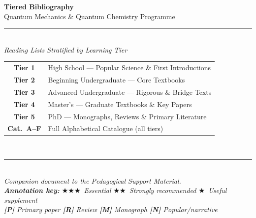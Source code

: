 \documentclass[11pt,a4paper]{article}
\newcommand{\essential}{$\bigstar\bigstar\bigstar$}
\newcommand{\recommended}{$\bigstar\bigstar$}
\newcommand{\useful}{$\bigstar$}
\begin{document}

\begin{titlepage}
\pagecolor{darkblue}
\color{white}
\vspace*{3cm}
\begin{center}
  {\fontsize{28}{34}\selectfont\bfseries Tiered Bibliography}\\[0.5cm]
  {\fontsize{17}{22}\selectfont Quantum Mechanics \& Quantum Chemistry Programme}\\[0.6cm]
  {\color{accentgold}\rule{10cm}{2pt}}\\[0.6cm]
  {\large\itshape Reading Lists Stratified by Learning Tier}\\[2.5cm]
  \begin{tabular}{@{}cl@{}}
    \colorbox{t1green}{\color{white}\bfseries Tier 1} & High School --- Popular Science \& First Introductions\\[4pt]
    \colorbox{t2blue}{\color{white}\bfseries Tier 2}  & Beginning Undergraduate --- Core Textbooks\\[4pt]
    \colorbox{t3purple}{\color{white}\bfseries Tier 3} & Advanced Undergraduate --- Rigorous \& Bridge Texts\\[4pt]
    \colorbox{t4orange}{\color{white}\bfseries Tier 4} & Master's --- Graduate Textbooks \& Key Papers\\[4pt]
    \colorbox{t5red}{\color{white}\bfseries Tier 5}   & PhD --- Monographs, Reviews \& Primary Literature\\[8pt]
    \colorbox{catgray}{\color{white}\bfseries Cat.~A--F} & Full Alphabetical Catalogue (all tiers)\\
  \end{tabular}\\[2.5cm]
  {\color{accentgold}\rule{10cm}{1pt}}\\[0.5cm]
  {\small\itshape Companion document to the Pedagogical Support Material.\\
  \textbf{Annotation key:}
  \essential\ Essential \quad
  \recommended\ Strongly recommended \quad
  \useful\ Useful supplement\\[4pt]
  \textbf{[P]} Primary paper \quad
  \textbf{[R]} Review \quad
  \textbf{[M]} Monograph \quad
  \textbf{[N]} Popular/narrative}
\end{center}
\vfill
\end{titlepage}
\nopagecolor

\tableofcontents
\newpage
\end{document}
